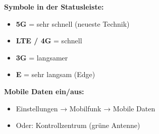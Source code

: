 \documentclass[a4paper,landscape,8pt]{extarticle}
\begin{document}
\begin{minipage}[t]{0.32\linewidth}
\textbf{Symbole in der Statusleiste:}
\begin{itemize}
\item \textbf{5G} = sehr schnell (neueste Technik)
\item \textbf{LTE / 4G} = schnell
\item \textbf{3G} = langsamer
\item \textbf{E} = sehr langsam (Edge)
\end{itemize}

\textbf{Mobile Daten ein/aus:}
\begin{itemize}
\item Einstellungen → Mobilfunk → Mobile Daten
\item Oder: Kontrollzentrum (grüne Antenne)
\end{itemize}

\end{minipage}%
\hfill%
\end{document}

